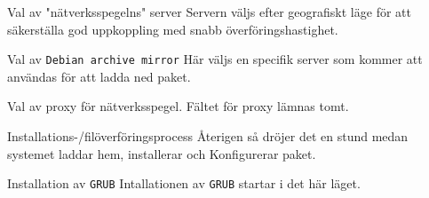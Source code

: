            {Val av "nätverksspegelns" server}
           {Servern väljs efter geografiskt läge för att säkerställa god
            uppkoppling med snabb överföringshastighet.}
           {}

           {Val av \texttt{Debian archive mirror}}
           {Här väljs en specifik server som kommer att användas för att
            ladda ned paket.}
           {}

           {Val av proxy för nätverksspegel.}
           {Fältet för proxy lämnas tomt.}
           {}

           {Installations-/filöverföringsprocess}
           {Återigen så dröjer det en stund medan systemet laddar hem,
            installerar och Konfigurerar paket.}
           {}

           {Installation av \texttt{GRUB}}
           {Intallationen av \texttt{GRUB} startar i det här läget.}
           {}

